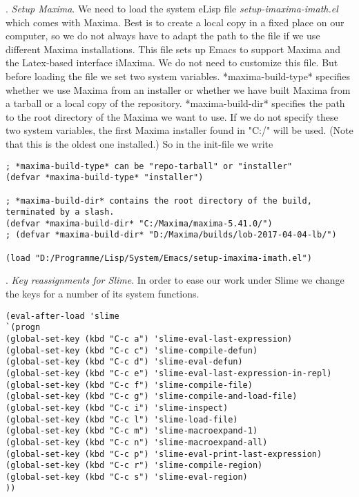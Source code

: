 \documentclass[../Maxima_Workbook.tex]{subfiles}
\begin{document}
. \emph{Setup Maxima}. We need to load the system eLisp file \emph{setup-imaxima-imath.el} which comes with Maxima. Best is to create a local copy in a fixed place on our computer, so we do not always have to adapt the path to the file if we use different Maxima installations. This file sets up Emacs to support Maxima and the Latex-based interface iMaxima. We do not need to customize this file. But before loading the file we set two system variables. *maxima-build-type* specifies whether we use Maxima from an installer or whether we have built Maxima from a tarball or a local copy of the repository. *maxima-build-dir* specifies the path to the root directory of the Maxima we want to use. If we do not specify these two system variables, the first Maxima installer found in "C:/" will be used. (Note that this is the oldest one installed.) So in the init-file we write

\begin{lstlisting}[style=lisp]
; *maxima-build-type* can be "repo-tarball" or "installer"
(defvar *maxima-build-type* "installer")

; *maxima-build-dir* contains the root directory of the build, 
terminated by a slash.
(defvar *maxima-build-dir* "C:/Maxima/maxima-5.41.0/")
; (defvar *maxima-build-dir* "D:/Maxima/builds/lob-2017-04-04-lb/")

(load "D:/Programme/Lisp/System/Emacs/setup-imaxima-imath.el")
\end{lstlisting}

. \emph{Key reassignments for Slime}. In order to ease our work under Slime we change the keys for a number of its system functions. 

\begin{lstlisting}[style=lisp]
(eval-after-load 'slime
`(progn
(global-set-key (kbd "C-c a") 'slime-eval-last-expression)
(global-set-key (kbd "C-c c") 'slime-compile-defun)
(global-set-key (kbd "C-c d") 'slime-eval-defun)
(global-set-key (kbd "C-c e") 'slime-eval-last-expression-in-repl)
(global-set-key (kbd "C-c f") 'slime-compile-file)
(global-set-key (kbd "C-c g") 'slime-compile-and-load-file)
(global-set-key (kbd "C-c i") 'slime-inspect)
(global-set-key (kbd "C-c l") 'slime-load-file)
(global-set-key (kbd "C-c m") 'slime-macroexpand-1)
(global-set-key (kbd "C-c n") 'slime-macroexpand-all)
(global-set-key (kbd "C-c p") 'slime-eval-print-last-expression)
(global-set-key (kbd "C-c r") 'slime-compile-region)
(global-set-key (kbd "C-c s") 'slime-eval-region)
))
\end{lstlisting}
\end{document}
